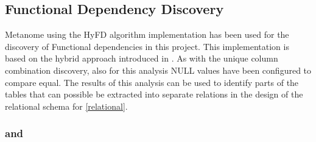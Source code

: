 
\subsection{Functional Dependency Discovery} \label{fd}

Metanome using the HyFD algorithm implementation has been used for the discovery of Functional dependencies in this project. This implementation is based on the hybrid approach introduced in \cite{papenbrock2016hybrid}. As with the unique column combination discovery, also for this analysis NULL values have been configured to compare equal. The results of this analysis can be used to identify parts of the tables that can possible be extracted into separate relations in the design of the relational schema for \cref{relational}.


\subsubsection{\texorpdfstring{ and }{bz\_infrastructure\_line and bz\_infrastructure\_node}}

